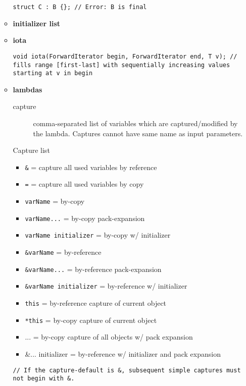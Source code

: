 \documentclass{article}
\begin{document}
\begin{itemize}
\begin{itemize}
\begin{lstlisting}[style=cpp]
struct C : B {}; // Error: B is final
			      \end{lstlisting}
		      \item \textbf{initializer list}
		      \item \textbf{iota}
		            \begin{lstlisting}[style=cpp]
void iota(ForwardIterator begin, ForwardIterator end, T v); // fills range [first-last] with sequentially increasing values starting at v in begin
			      \end{lstlisting}
		      \item \textbf{lambdas}
		            \begin{description}
			            \item[capture]
			                  comma-separated list of variables which are captured/modified by the lambda. Captures cannot have same name as input parameters.
		            \end{description}
		            Capture list
		            \begin{itemize}
			            \item \verb!&! = capture all used variables by reference
			            \item \verb!=! = capture all used variables by copy
			            \item \verb!varName! = by-copy
			            \item \verb!varName...! = by-copy pack-expansion
			            \item \verb!varName initializer! = by-copy  w/ initializer
			            \item \verb!&varName! = by-reference
			            \item \verb!&varName...! = by-reference pack-expansion
			            \item \verb!&varName initializer! = by-reference w/ initializer
			            \item \verb!this! = by-reference capture of current object
			            \item \verb!*this! = by-copy capture of current object
			            \item ... = by-copy capture of all objects w/ pack expansion
			            \item &... initializer = by-reference w/ initializer and pack expansion
		            \end{itemize}
		            \begin{lstlisting}[style=cpp]
// If the capture-default is &, subsequent simple captures must not begin with &. 

\end{lstlisting}
\end{itemize}
\end{itemize}
\end{document}
